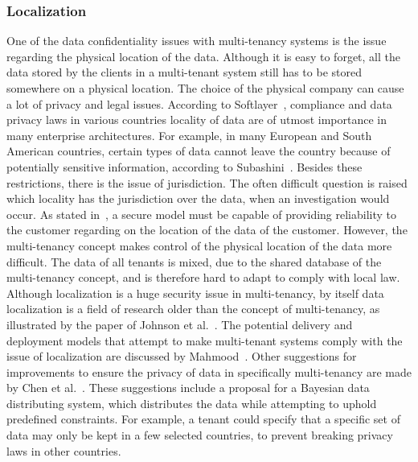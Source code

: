 \subsubsection{Localization}
One of the data confidentiality issues with multi-tenancy systems is the issue regarding the physical location of the data. 
Although it is easy to forget, all the data stored by the clients in a multi-tenant system still has to be stored somewhere on a physical location. 
The choice of the physical company can cause a lot of privacy and legal issues. 
According to Softlayer~\cite{Softlayer2009Security}, compliance and data privacy laws in various countries locality of data are of utmost importance in many enterprise architectures. 
For example, in many European and South American countries, certain types of data cannot leave the country because of potentially sensitive information, according to Subashini~\cite{Subashini2011Security}.
Besides these restrictions, there is the issue of jurisdiction.
The often difficult question is raised which locality has the jurisdiction over the data, when an investigation would occur.
As stated in~\cite{Subashini2011Security}, a secure model must be capable of providing reliability to the customer regarding on the location of the data of the customer.
However, the multi-tenancy concept makes control of the physical location of the data more difficult. The data of all tenants is mixed, due to the shared database of the multi-tenancy concept, and is therefore hard to adapt to comply with local law.\\

Although localization is a huge security issue in multi-tenancy, by itself data localization is a field of research older than the concept of multi-tenancy, as illustrated by the paper of Johnson et al.~\cite{Johnson1996Law}. 
The potential delivery and deployment models that attempt to make multi-tenant systems comply with the issue of localization are discussed by Mahmood~\cite{Mahmood2011Security}.
Other suggestions for improvements to ensure the privacy of data in specifically multi-tenancy are made by Chen et al.~\cite{Chen2012Security}. These suggestions include a proposal for a Bayesian data distributing system, which distributes the data while attempting to uphold predefined constraints. For example, a tenant could specify that a specific set of data may only be kept in a few selected countries, to prevent breaking privacy laws in other countries. 

